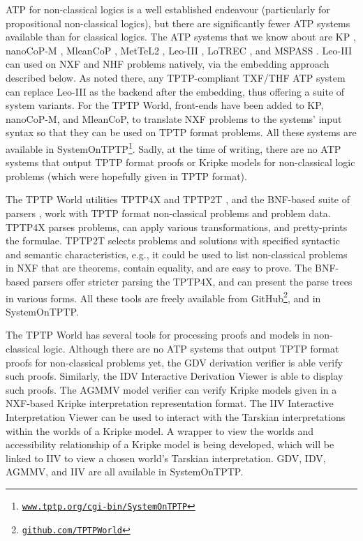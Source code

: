 \documentclass[runningheads]{llncs}
\begin{document}
ATP for non-classical logics is a well established endeavour (particularly for propositional
non-classical logics), but there are significantly fewer ATP systems available than for classical 
logics.
The ATP systems that we know about are
K\raisebox{-3pt}{S}P \cite{NHD20,PN+21}, nanoCoP-M \cite{Ott21}, MleanCoP \cite{Ott14}, 
MetTeL2 \cite{TSK12}, Leo-III \cite{SB21}, LoTREC \cite{FF+01}, and MSPASS \cite{HS00-TABLEAUX}.
Leo-III can used on NXF and NHF problems natively, via the embedding approach described below.
As noted there, any TPTP-compliant TXF/THF ATP system can replace Leo-III as the backend after
the embedding, thus offering a suite of system variants.
For the TPTP World, front-ends have been added to K\raisebox{-3pt}{S}P, nanoCoP-M, and MleanCoP,
to translate NXF problems to the systems' input syntax so that they can be used on TPTP
format problems.
All these systems are available in SystemOnTPTP\footnote{%
\href{https://www.tptp.org/cgi-bin/SystemOnTPTP}{\tt www.tptp.org/cgi-bin/SystemOnTPTP}}.
Sadly, at the time of writing, there are no ATP systems that output TPTP format proofs or 
Kripke models for non-classical logic problems (which were hopefully given in TPTP format).

The TPTP World utilities TPTP4X and TPTP2T \cite{Sut07-CSR,Sut10}, and the BNF-based suite
of parsers \cite{VS06}, work with TPTP format non-classical problems and problem data.
TPTP4X parses problems, can apply various transformations, and pretty-prints the formulae.
TPTP2T selects problems and solutions with specified syntactic and semantic characteristics,
e.g., it could be used to list non-classical problems in NXF that are theorems, contain equality,
and are easy to prove.
The BNF-based parsers offer stricter parsing the TPTP4X, and can present the parse trees in
various forms.
All these tools are freely available from GitHub\footnote{%
\href{https://github.com/TPTPWorld}{\tt github.com/TPTPWorld}}, and in SystemOnTPTP.

The TPTP World has several tools for processing proofs and models in non-classical logic.
Although there are no ATP systems that output TPTP format proofs for non-classical problems yet, the
GDV derivation verifier \cite{Sut06} is able verify such proofs.
Similarly, the IDV Interactive Derivation Viewer \cite{TPS07} is able to display such proofs.
The AGMMV model verifier can verify Kripke models given in a NXF-based Kripke interpretation
representation format.
The IIV Interactive Interpretation Viewer \cite{MS23-Poster} can be used to interact with the
Tarskian interpretations within the worlds of a Kripke model. 
A wrapper to view the worlds and accessibility relationship of a Kripke model is being developed,
which will be linked to IIV to view a chosen world's Tarskian interpretation.
GDV, IDV, AGMMV, and IIV are all available in SystemOnTPTP.
\end{document}
